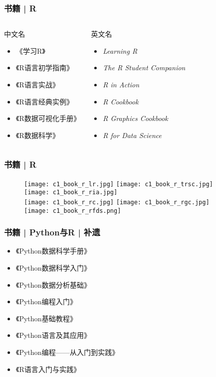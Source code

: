 \begin{frame}
  \frametitle{书籍 | R}
  \begin{columns}
  \begin{block}{中文名}
    \begin{itemize}
      \item \alert{《学习R》}
      \item 《R语言初学指南》
      \item 《R语言实战》
      \item \alert{《R语言经典实例》}
      \item \alert{《R数据可视化手册》}
      \item \alert{《R数据科学》}
    \end{itemize}
  \end{block}
  \begin{block}{英文名}
    \begin{itemize}
      \item \textit{Learning R}
      \item \textit{The R Student Companion}
      \item \textit{R in Action}
      \item \textit{R Cookbook}
      \item \textit{R Graphics Cookbook}
      \item \textit{R for Data Science}
    \end{itemize}
  \end{block}
\end{columns}
\end{frame}

\begin{frame}
  \frametitle{书籍 | R}
  \begin{figure}
    \centering
    \texttt{[image: c1\_book\_r\_lr.jpg]}\qquad
    \texttt{[image: c1\_book\_r\_trsc.jpg]}\qquad
    \texttt{[image: c1\_book\_r\_ria.jpg]}\\
    \texttt{[image: c1\_book\_r\_rc.jpg]}\qquad
    \texttt{[image: c1\_book\_r\_rgc.jpg]}\qquad
    \texttt{[image: c1\_book\_r\_rfds.png]}\\
  \end{figure}
\end{frame}

\begin{frame}
  \frametitle{书籍 | Python与R | 补遗}
  \begin{itemize}
    \item 《Python数据科学手册》
    \item 《Python数据科学入门》
    \item 《Python数据分析基础》
    \item 《Python编程入门》
    \item 《Python基础教程》
    \item 《Python语言及其应用》
    \item 《Python编程——从入门到实践》
    \item 《R语言入门与实践》
  \end{itemize}
\end{frame}

